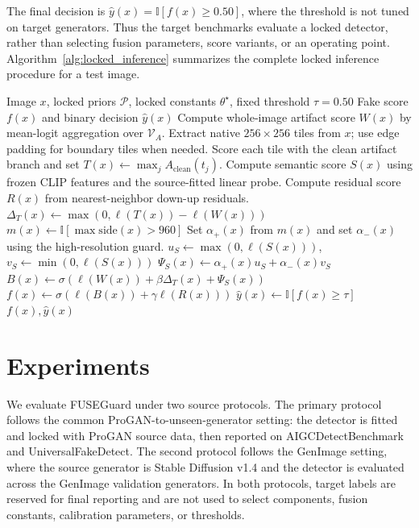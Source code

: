 \documentclass[lettersize,journal]{IEEEtran}
\begin{document}
The final decision is $\hat{y}(x)=\mathbb{I}\left[f(x)\geq0.50\right]$, where the threshold is not tuned on target generators. Thus the target benchmarks evaluate a locked detector, rather than selecting fusion parameters, score variants, or an operating point. Algorithm~\ref{alg:locked_inference} summarizes the complete locked inference procedure for a test image.

\begin{algorithm}[t]
\caption{Locked multi-prior scoring}
\label{alg:locked_inference}
\begin{algorithmic}[1]
\REQUIRE Image $x$, locked priors $\mathcal{P}$, locked constants $\theta^\star$, fixed threshold $\tau=0.50$
\ENSURE Fake score $f(x)$ and binary decision $\hat{y}(x)$
\STATE Compute whole-image artifact score $W(x)$ by mean-logit aggregation over $\mathcal{V}_A$.
\STATE Extract native $256\times256$ tiles from $x$; use edge padding for boundary tiles when needed.
\STATE Score each tile with the clean artifact branch and set $T(x)\leftarrow\max_j A_{\mathrm{clean}}(t_j)$.
\STATE Compute semantic score $S(x)$ using frozen CLIP features and the source-fitted linear probe.
\STATE Compute residual score $R(x)$ from nearest-neighbor down-up residuals.
\STATE $\Delta_T(x)\leftarrow\max(0,\ell(T(x))-\ell(W(x)))$
\STATE $m(x)\leftarrow\mathbb{I}[\max\mathrm{side}(x)>960]$
\STATE Set $\alpha_+(x)$ from $m(x)$ and set $\alpha_-(x)$ using the high-resolution guard.
\STATE $u_S\leftarrow\max(0,\ell(S(x)))$, \quad $v_S\leftarrow\min(0,\ell(S(x)))$
\STATE $\Psi_S(x)\leftarrow\alpha_+(x)u_S+\alpha_-(x)v_S$
\STATE $B(x)\leftarrow\sigma(\ell(W(x))+\beta\Delta_T(x)+\Psi_S(x))$
\STATE $f(x)\leftarrow\sigma(\ell(B(x))+\gamma\ell(R(x)))$
\STATE $\hat{y}(x)\leftarrow\mathbb{I}[f(x)\geq\tau]$
\RETURN $f(x),\hat{y}(x)$
\end{algorithmic}
\end{algorithm}

\section{Experiments}
\label{sec:experiments}
We evaluate FUSEGuard under two source protocols. The primary protocol follows the common ProGAN-to-unseen-generator setting: the detector is fitted and locked with ProGAN source data, then reported on AIGCDetectBenchmark~\cite{zhong2023patchcraft} and UniversalFakeDetect. The second protocol follows the GenImage setting, where the source generator is Stable Diffusion v1.4 and the detector is evaluated across the GenImage validation generators. In both protocols, target labels are reserved for final reporting and are not used to select components, fusion constants, calibration parameters, or thresholds.
\end{document}
